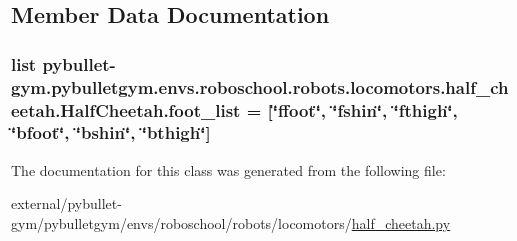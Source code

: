 \subsection{Member Data Documentation}
\subsubsection[{\texorpdfstring{foot\+\_\+list}{foot_list}}]{\setlength{\rightskip}{0pt plus 5cm}list pybullet-\/gym.\+pybulletgym.\+envs.\+roboschool.\+robots.\+locomotors.\+half\+\_\+cheetah.\+Half\+Cheetah.\+foot\+\_\+list = \mbox{[}\char`\"{}ffoot\char`\"{}, \char`\"{}fshin\char`\"{}, \char`\"{}fthigh\char`\"{}, \char`\"{}bfoot\char`\"{}, \char`\"{}bshin\char`\"{}, \char`\"{}bthigh\char`\"{}\mbox{]}\hspace{0.3cm}{\ttfamily [static]}}\hypertarget{classpybullet-gym_1_1pybulletgym_1_1envs_1_1roboschool_1_1robots_1_1locomotors_1_1half__cheetah_1_1_half_cheetah_ad1a868645241554e3a95101c731121e9}{}\label{classpybullet-gym_1_1pybulletgym_1_1envs_1_1roboschool_1_1robots_1_1locomotors_1_1half__cheetah_1_1_half_cheetah_ad1a868645241554e3a95101c731121e9}


The documentation for this class was generated from the following file\+:\begin{DoxyCompactItemize}
\item 
external/pybullet-\/gym/pybulletgym/envs/roboschool/robots/locomotors/\hyperlink{roboschool_2robots_2locomotors_2half__cheetah_8py}{half\+\_\+cheetah.\+py}\end{DoxyCompactItemize}
